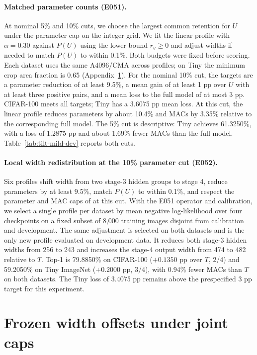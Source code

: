 \paragraph{Matched parameter counts (E051).}
At nominal 5\% and 10\% cuts, we choose the largest common retention for
$U$ under the parameter cap on the integer grid. We fit the linear profile
with $\alpha=0.30$ against $P(U)$ using the lower bound $r_g\ge 0$ and
adjust widths if needed to match $P(U)$ to within 0.1\%. Both budgets
were fixed before scoring. Each dataset uses the same A4096/CMA across
profiles; on Tiny the minimum crop area fraction is 0.65
(Appendix~\ref{app:offsets}). For the nominal 10\% cut, the targets are a
parameter reduction of at least 9.5\%, a mean gain of at least 1 pp over
$U$ with at least three positive pairs, and a mean loss to the full model
of at most 3 pp. CIFAR-100 meets all targets; Tiny has a 3.6075 pp mean
loss. At this cut,
the linear profile reduces parameters by about 10.4\% and MACs by 3.35\%
relative to the corresponding full model. The 5\% cut is descriptive:
Tiny achieves 61.3250\%, with a loss of 1.2875 pp and about 1.69\% fewer
MACs than the full model. Table~\ref{tab:tilt-mild-dev} reports both cuts.



\paragraph{Local width redistribution at the 10\% parameter cut (E052).}
Six profiles shift width from two stage-3 hidden groups to stage 4,
reduce parameters by at least 9.5\%, match $P(U)$ to within 0.1\%, and
respect the parameter and MAC caps of \Tilt{} at this cut. With the E051
operator and calibration, we select a single profile per dataset by
mean negative log-likelihood over four checkpoints on a fixed subset of
8,000 training images disjoint from calibration and development. The
same adjustment is selected on both datasets and is the only new profile
evaluated on development data. It
reduces both stage-3 hidden widths from 256 to 243 and increases the
stage-4 output width from 474 to 482 relative to $T$. Top-1 is 79.8850\%
on CIFAR-100 ($+0.1350$ pp over $T$, 2/4) and 59.2050\% on Tiny ImageNet
($+0.2000$ pp, 3/4), with 0.94\% fewer MACs than $T$ on both datasets.
The Tiny loss of 3.4075 pp remains above the prespecified 3 pp target for
this experiment.
\FloatBarrier

\section{Frozen width offsets under joint caps}
\label{app:offsets}


